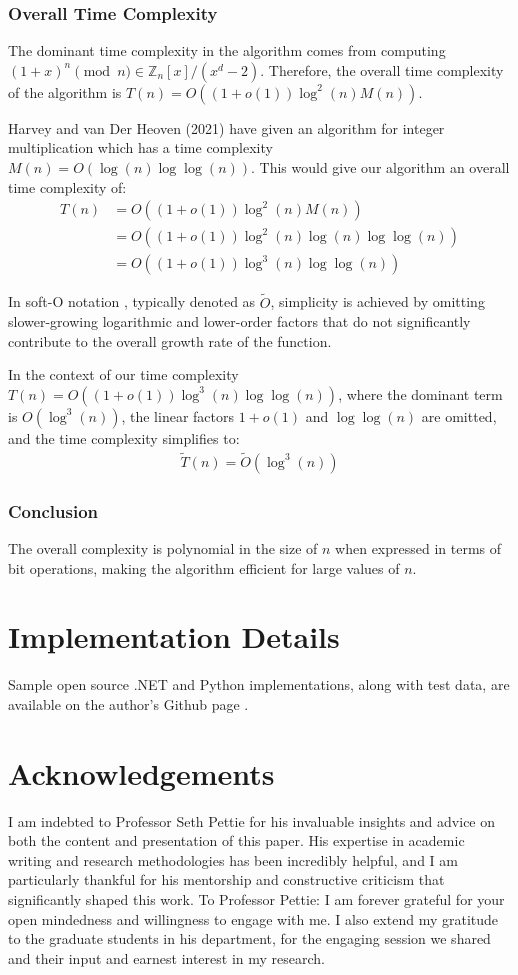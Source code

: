\documentclass{article}
\theoremstyle{plain}
\theoremstyle{definition}
\newcommand{\Z}{\mathbb{Z}}
\begin{document}
\subsubsection{Overall Time Complexity}
The dominant time complexity in the algorithm comes from computing \( (1+x)^n \pmod{n} \in \Z_n[x]/(x^d-2) \). Therefore, the overall time complexity of the algorithm is \( T(n) = O((1 + o(1)) \log^2(n) M(n)) \).

Harvey and van Der Heoven (2021) \cite{harveyvanderhoeven2021} have given an algorithm for integer multiplication which has a time complexity $M(n) = O(\log(n) \log\log(n))$. This would give our algorithm an overall time complexity of:
\begin{align}
    T(n) &= O((1 + o(1)) \log^2(n) M(n)) \\ &= O((1 + o(1)) \log^2(n) \log(n) \log\log(n)) \\ &= O((1 + o(1)) \log^3(n) \log\log(n))
\end{align}

In soft-O notation \cite{gathengerhard2013softo}, typically denoted as $\tilde{O}$, simplicity is achieved by omitting slower-growing logarithmic and lower-order factors that do not significantly contribute to the overall growth rate of the function.

In the context of our time complexity $T(n) = O((1 + o(1)) \log^3(n) \log\log(n))$, where the dominant term is \(O(\log^3(n))\), the linear factors \(1 + o(1)\) and \(\log\log(n)\) are omitted, and the time complexity simplifies to:
\begin{align}
    \tilde{T}(n) = \tilde{O}(\log^3(n))
\end{align}

\subsubsection{Conclusion}
The overall complexity is polynomial in the size of \( n \) when expressed in terms of bit operations, making the algorithm efficient for large values of \( n \).

\section{Implementation Details}
Sample open source .NET and Python implementations, along with test data, are available on the author's Github page \cite{githubrepo}.

\section{Acknowledgements}
I am indebted to Professor Seth Pettie for his invaluable insights and advice on both the content and presentation of this paper. His expertise in academic writing and research methodologies has been incredibly helpful, and I am particularly thankful for his mentorship and constructive criticism that significantly shaped this work. To Professor Pettie: I am forever grateful for your open mindedness and willingness to engage with me. I also extend my gratitude to the graduate students in his department, for the engaging session we shared and their input and earnest interest in my research.
\end{document}
